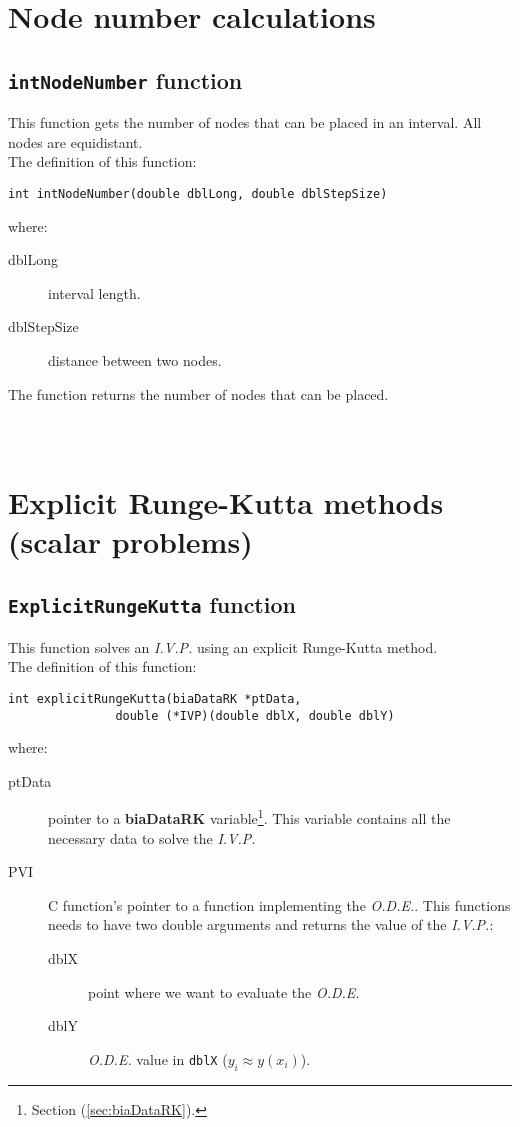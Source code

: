 \section{Node number calculations}

\subsection{\texttt{intNodeNumber} function}

This function gets the number of nodes that can be placed in an interval. All nodes are equidistant.\\

The definition of this function:
%
\begin{verbatim}
int intNodeNumber(double dblLong, double dblStepSize)
\end{verbatim}
%
where:
%
\begin{description}
\item[dblLong] interval length.
\item[dblStepSize] distance between two nodes.
\end{description}

The function returns the number of nodes that can be placed.\\ \\
%
\ \\

\section{Explicit Runge-Kutta methods (scalar problems)}

\subsection{\texttt{ExplicitRungeKutta} function}

This function solves an \emph{I.V.P.} using an explicit Runge-Kutta method.\\

The definition of this function:
%
\begin{verbatim}
int explicitRungeKutta(biaDataRK *ptData, 
               double (*IVP)(double dblX, double dblY)
\end{verbatim} 
%
where:
%
\begin{description}
\item[ptData] pointer to a \textbf{biaDataRK} variable\footnote{Section (\ref{sec:biaDataRK}).}. This variable contains all the necessary data to solve the \emph{I.V.P.}
\item[PVI] C function's pointer to a function implementing the \emph{O.D.E.}. This functions needs to have two double arguments and returns the value of the \emph{I.V.P.}:
\begin{description}
	\item[dblX] point where we want to evaluate the \emph{O.D.E.}
	\item[dblY] \emph{O.D.E.} value in \texttt{dblX} ($y_i \approx y(x_i)$).
\end{description}
\end{description}

